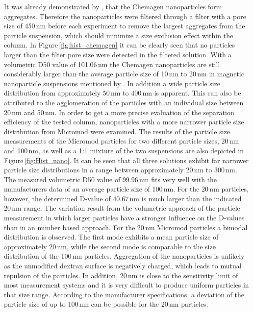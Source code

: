 It was already demonstrated by \cite{AndreMaster}, that the Chemagen nanoparticles form aggregates. Therefore the nanoparticles were filtered through a filter with a pore size of 450\,nm before each experiment to remove the largest aggregates from the particle suspension, which should minimize a size exclusion effect within the column. In Figure\,\ref{fig:hist_chemagen} it can be clearly seen that no particles larger than the filter pore size were detected in the filtered solution. With a volumetric D50 value of 101.06\,nm the Chemagen nanoparticles are still considerably larger than the average particle size of 10\,nm to 20\,nm in magnetic nanoparticle suspensions mentioned by \cite{svoboda2004magnetic}. In addition a wide particle size distribution from approximately 50\,nm to 400\,nm is apparent. This can also be attributed to the agglomeration of the particles with an individual size between 20\,nm and 50\,nm.
In order to get a more precise evaluation of the separation efficiency of the tested column, nanoparticles with a more narrower particle size distribution from Micromod were examined. The results of the particle size measurements of the Micromod particles for two different particle sizes, 20\,nm and 100\,nm, as well as a 1:1 mixture of the two suspensions are also depicted in Figure\,\ref{fig:Hist_nano}. It can be seen that all three solutions exhibit far narrower particle size distributions in a range between approximately 20\,nm to 300\,nm. The measured volumetric D50 value of 99.96\,nm fits very well with the manufacturers data of an average particle size of 100\,nm. For the 20\,nm particles, however, the determined D-value of 40.67\,nm is much larger than the indicated 20\,nm range. The variation result from the volumetric approach of the particle measurement in which larger particles have a stronger influence on the D-values than in an number based approach. For the 20\,nm Micromod particles a bimodal distribution is observed. The first mode exhibits a mean particle size of approximately 20\,nm, while the second mode is comparable to the size distribution of the 100\,nm particles. Aggregation of the nanoparticles is unlikely as the unmodified dextran surface is negatively charged, which leads to mutual repulsion of the particles. In addition, 20\,nm is close to the sensitivity limit of most measurement systems and it is very difficult to produce uniform particles in that size range. According to the manufacturer specifications, a deviation of the particle size of up to 100\,nm can be possible for the 20\,nm particles.

